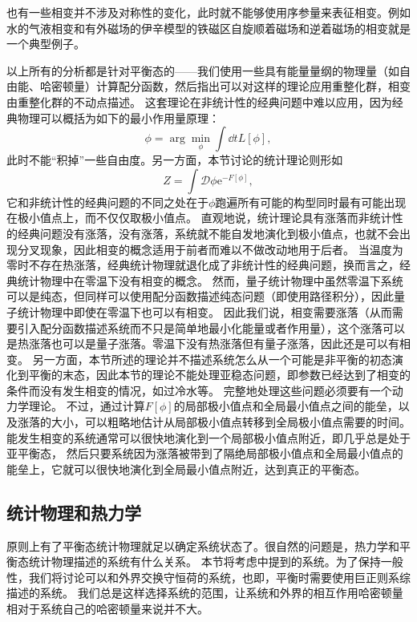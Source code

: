 \documentclass[hyperref, UTF8, a4paper]{ctexart}
\newcommand*{\ee}{\mathrm{e}}
\newcommand*{\fd}[1]{\mathcal{D}{#1}}
\renewcommand{\autoref}{\prettyref}
\begin{document}
也有一些相变并不涉及对称性的变化，此时就不能够使用序参量来表征相变。例如水的气液相变和有外磁场的伊辛模型的铁磁区自旋顺着磁场和逆着磁场的相变就是一个典型例子。

以上所有的分析都是针对平衡态的——我们使用一些具有能量量纲的物理量（如自由能、哈密顿量）计算配分函数，然后指出可以对这样的理论应用重整化群，相变由重整化群的不动点描述。
这套理论在非统计性的经典问题中难以应用，因为经典物理可以概括为如下的最小作用量原理：
\[
    \phi = \arg\min_{\phi} \int \dd{t} L[\phi],
\]
此时不能“积掉”一些自由度。另一方面，本节讨论的统计理论则形如
\[
   Z = \int \fd{\phi} \ee^{- F[\phi]},
\]
它和非统计性的经典问题的不同之处在于$\phi$跑遍所有可能的构型同时最有可能出现在极小值点上，而不仅仅取极小值点。
直观地说，统计理论具有涨落而非统计性的经典问题没有涨落，没有涨落，系统就不能自发地演化到极小值点，也就不会出现分叉现象，因此相变的概念适用于前者而难以不做改动地用于后者。
当温度为零时不存在热涨落，经典统计物理就退化成了非统计性的经典问题，换而言之，经典统计物理中在零温下没有相变的概念。
然而，量子统计物理中虽然零温下系统可以是纯态，但同样可以使用配分函数描述纯态问题（即使用路径积分），因此量子统计物理中即使在零温下也可以有相变。
因此我们说，相变需要涨落（从而需要引入配分函数描述系统而不只是简单地最小化能量或者作用量），这个涨落可以是热涨落也可以是量子涨落。零温下没有热涨落但有量子涨落，因此还是可以有相变。
另一方面，本节所述的理论并不描述系统怎么从一个可能是非平衡的初态演化到平衡的末态，因此本节的理论不能处理亚稳态问题，即参数已经达到了相变的条件而没有发生相变的情况，如过冷水等。
完整地处理这些问题必须要有一个动力学理论。
不过，通过计算$F[\phi]$的局部极小值点和全局最小值点之间的能垒，以及涨落的大小，可以粗略地估计从局部极小值点转移到全局极小值点需要的时间。
能发生相变的系统通常可以很快地演化到一个局部极小值点附近，即几乎总是处于亚平衡态，%
然后只要系统因为涨落被带到了隔绝局部极小值点和全局最小值点的能垒上，它就可以很快地演化到全局最小值点附近，达到真正的平衡态。

\subsection{统计物理和热力学}\label{sec:from-statistical-to-thermo}

原则上有了平衡态统计物理就足以确定系统状态了。很自然的问题是，热力学和平衡态统计物理描述的系统有什么关系。
本节将考虑\autoref{sec:equilibrium-system}中提到的系统。为了保持一般性，我们将讨论可以和外界交换守恒荷的系统，也即，平衡时需要使用巨正则系综描述的系统。
我们总是这样选择系统的范围，让系统和外界的相互作用哈密顿量相对于系统自己的哈密顿量来说并不大。
\end{document}
